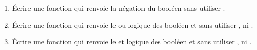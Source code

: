\begin{enumerate}[label = \emph{\alph*)}]
  \item \'Ecrire une fonction  qui renvoie la négation du booléen  sans utiliser .
  \item \'Ecrire une fonction  qui renvoie le ou logique des booléen  et  sans utiliser ,  ni .
  \item \'Ecrire une fonction  qui renvoie le et logique des booléen  et  sans utiliser ,  ni .
\end{enumerate}
